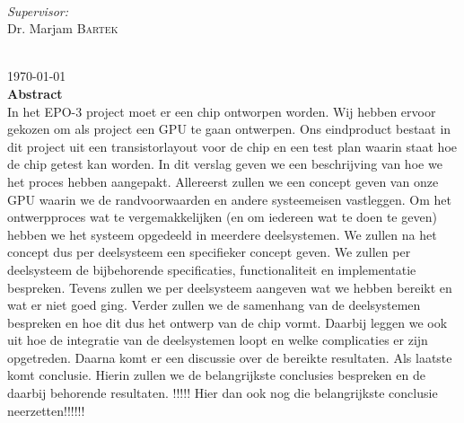 \documentclass[12pt]{scrreprt}
\begin{document}
\begin{titlepage}
\begin{minipage}{0.4\textwidth}
\begin{flushleft}
\end{flushleft}
\end{minipage}
~
\begin{minipage}{0.4\textwidth}
\begin{flushright} \large
\emph{Supervisor:} \\
Dr. Marjam \textsc{Bartek} %
\end{flushright}
\end{minipage}\\[3cm]



{\large \today}\\ [1.5cm]


 
% 

\textbf{Abstract} \\
In het EPO-3 project moet er een chip ontworpen worden. Wij hebben ervoor gekozen om als project een GPU te gaan ontwerpen. Ons eindproduct bestaat in dit project uit een transistorlayout voor de chip en een test plan waarin staat hoe de chip getest kan worden.
In dit verslag geven we een beschrijving van hoe we het proces hebben aangepakt. Allereerst zullen we een concept geven van onze GPU waarin we de randvoorwaarden en andere systeemeisen vastleggen. Om het ontwerpproces wat te vergemakkelijken (en om iedereen wat te doen te geven) hebben we het systeem opgedeeld in meerdere deelsystemen. We zullen na het concept dus per deelsysteem een specifieker concept geven. We zullen per deelsysteem de bijbehorende specificaties, functionaliteit en implementatie bespreken. Tevens zullen we per deelsysteem aangeven wat we hebben bereikt en wat er niet goed ging. Verder zullen we de samenhang van de deelsystemen bespreken en hoe dit dus het ontwerp van de chip vormt. Daarbij leggen we ook uit hoe de integratie van de deelsystemen loopt en welke complicaties er zijn opgetreden. Daarna komt er een discussie over de bereikte resultaten. Als laatste komt conclusie. Hierin zullen we de belangrijkste conclusies bespreken en de daarbij behorende resultaten. !!!!! Hier dan ook nog die belangrijkste conclusie neerzetten!!!!!!

\vfill %

\end{titlepage}
\end{document}
